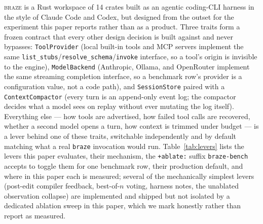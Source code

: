 \documentclass[smallcondensed,natbib]{svjour3}
\newcommand{\braze}{\textsc{braze}}
\begin{document}
\braze{} is a Rust workspace of 14 crates built as an agentic
coding-CLI harness in the style of Claude Code and Codex, but designed
from the outset for the experiment this paper reports rather than as a
product. Three traits form a frozen contract that every other design
decision is built against and never bypasses: \texttt{ToolProvider}
(local built-in tools and MCP servers implement the same
\texttt{list\_stubs}/\texttt{resolve\_schema}/\texttt{invoke} interface,
so a tool's origin is invisible to the engine), \texttt{ModelBackend}
(Anthropic, Ollama, and OpenRouter implement the same streaming
completion interface, so a benchmark row's provider is a configuration
value, not a code path), and \texttt{SessionStore} paired with a
\texttt{ContextCompactor} (every turn is an append-only event log; the
compactor decides what a model sees on replay without ever mutating the
log itself). Everything else --- how tools are advertised, how failed
tool calls are recovered, whether a second model opens a turn, how
context is trimmed under budget --- is a lever behind one of these
traits, switchable independently and by default matching what a real
\texttt{braze} invocation would run. Table~\ref{tab:levers} lists the
levers this paper evaluates, their mechanism, the \texttt{+ablate:}
suffix \texttt{braze-bench} accepts to toggle them for one benchmark
row, their production default, and where in this paper each is
measured; several of the mechanically simplest levers (post-edit
compiler feedback, best-of-$n$ voting, harness notes, the unablated
observation collapse) are implemented and shipped but not isolated by
a dedicated ablation sweep in this paper, which we mark honestly rather
than report as measured.
\end{document}
